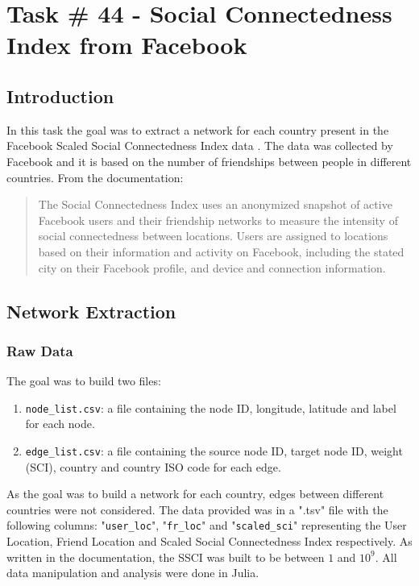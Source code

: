 \chapter{Task \# 44 - Social Connectedness Index  from Facebook}

\section{Introduction}
In this task the goal was to extract a network for each country present in the Facebook Scaled Social Connectedness Index data \cite{FacebookSocialConnectednessIndexData}.
The data was collected by Facebook and it is based on the number of friendships between people in different countries.
From the documentation:
\begin{quote}
The Social Connectedness Index uses an anonymized snapshot of active Facebook users and their friendship networks to measure the intensity of social connectedness between locations. Users are assigned to locations based on their information and activity on Facebook, including the stated city on their Facebook profile, and device and connection information.
\end{quote}

\section{Network Extraction}
\subsection{Raw Data}
The goal was to build two files:
\begin{enumerate}
    \item \texttt{node\_list.csv}: a file containing the node ID, longitude, latitude and label for each node.
    \item \texttt{edge\_list.csv}: a file containing the source node ID, target node ID, weight (SCI), country and country ISO code for each edge.
\end{enumerate}
As the goal was to build a network for each country, edges between different countries were not considered.
The data provided was in a ".tsv" file with the following columns: "\texttt{user\_loc}", "\texttt{fr\_loc}" and "\texttt{scaled\_sci}" representing the User Location, Friend Location and Scaled Social Connectedness Index respectively.
As written in the documentation, the SSCI was built to be between $1$ and $10^9$.
All data manipulation and analysis were done in Julia\cite{julia}.

